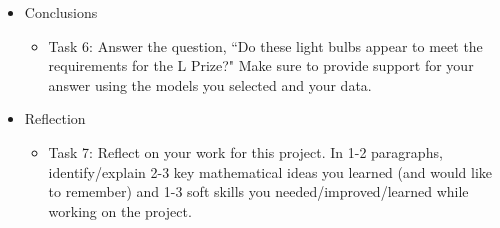 \documentclass{article}
\theoremstyle{plain}
\theoremstyle{box}
\begin{document}
\begin{itemize}
\begin{itemize}
\begin{itemize}
		\item Can you explain any of your observations using what you know about the five building block functions and 5 function operations that were used to build up the function $f_5$?
		\item What did you notice about the values of $b$ and $c$ (and their combinations) that you can used to help fine tune the behavior of $f_5$ to fit the context of the light bulb story?
		\end{itemize}
	\item Task 5c: Create plots with both the data (the scatterplot) and a selected model ($f_5$ with the parameter values you picked). Include your best visual fit and one poor visual fit. Make sure you clearly indicate which parameter values you used in each case.
	\item Task 5d: Explain what your best visual fit parameters mean in the context of the light bulb question.
	\end{itemize}
\item Conclusions
	\begin{itemize}
	\item Task 6: Answer the question, ``Do these light bulbs appear to meet the requirements for the L Prize?" Make sure to provide support for your answer using the models you selected and your data. 
	\end{itemize}
\item Reflection
	\begin{itemize}
	\item Task 7: Reflect on your work for this project. In 1-2 paragraphs, identify/explain 2-3 key mathematical  ideas you learned (and would like to remember) and 1-3 soft skills you needed/improved/learned while working on the project.
	\end{itemize}
\end{itemize}


 
\end{document}
